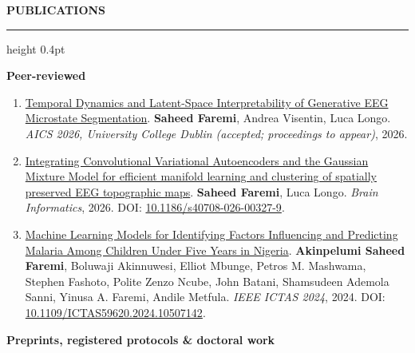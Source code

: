 \documentclass[11pt]{article}
\newcommand{\cvsection}[1]{%
  \par\vspace{5pt}%
  {\fontsize{11.5pt}{13pt}\selectfont\bfseries\MakeUppercase{#1}\par}%
  \nobreak\vspace{2pt}\hrule height 0.4pt\nobreak\vspace{2pt}%
}
\begin{document}
\cvsection{Publications}
\noindent\textbf{Peer-reviewed}\par
\vspace{2pt}
\begin{enumerate}
  \setlength{\itemsep}{2pt}
  \item \href{https://aics2026.com/}{Temporal Dynamics and Latent-Space Interpretability of Generative EEG Microstate Segmentation}.\newline
  \textbf{Saheed Faremi}, Andrea Visentin, Luca Longo.\newline
  \emph{AICS 2026, University College Dublin (accepted; proceedings to appear)}, 2026.

  \item \href{https://link.springer.com/article/10.1186/s40708-026-00327-9}{Integrating Convolutional Variational Autoencoders and the Gaussian Mixture Model for efficient manifold learning and clustering of spatially preserved EEG topographic maps}.\newline
  \textbf{Saheed Faremi}, Luca Longo.\newline
  \emph{Brain Informatics}, 2026. DOI: \href{https://doi.org/10.1186/s40708-026-00327-9}{10.1186/s40708-026-00327-9}.

  \item \href{https://doi.org/10.1109/ICTAS59620.2024.10507142}{Machine Learning Models for Identifying Factors Influencing and Predicting Malaria Among Children Under Five Years in Nigeria}.\newline
  \textbf{Akinpelumi Saheed Faremi}, Boluwaji Akinnuwesi, Elliot Mbunge, Petros M. Mashwama, Stephen Fashoto, Polite Zenzo Ncube, John Batani, Shamsudeen Ademola Sanni, Yinusa A. Faremi, Andile Metfula.\newline
  \emph{IEEE ICTAS 2024}, 2024. DOI: \href{https://doi.org/10.1109/ICTAS59620.2024.10507142}{10.1109/ICTAS59620.2024.10507142}.
\end{enumerate}
\vspace{5pt}
\noindent\textbf{Preprints, registered protocols \& doctoral work}\par
\vspace{2pt}
\end{document}
